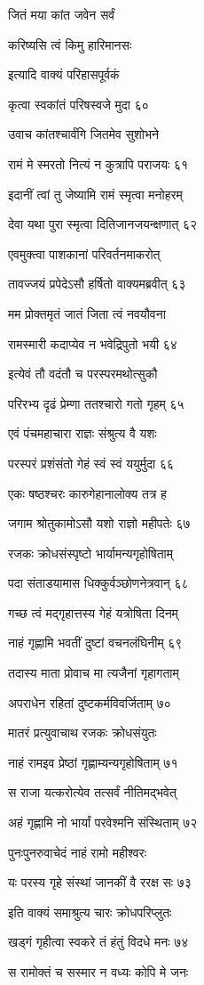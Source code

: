 जितं मया कांत जवेन सर्वं

करिष्यसि त्वं किमु हारिमानसः

इत्यादि वाक्यं परिहासपूर्वकं

कृत्वा स्वकांतं परिषस्वजे मुदा ६०

उवाच कांतश्चार्वंगि जितमेव सुशोभने

रामं मे स्मरतो नित्यं न कुत्रापि पराजयः ६१

इदानीं त्वां तु जेष्यामि रामं स्मृत्वा मनोहरम्

देवा यथा पुरा स्मृत्वा दितिजानजयन्क्षणात् ६२

एवमुक्त्वा पाशकानां परिवर्तनमाकरोत्

तावज्जयं प्रपेदेऽसौ हर्षितो वाक्यमब्रवीत् ६३

मम प्रोक्तमृतं जातं जिता त्वं नवयौवना

रामस्मारी कदाप्येव न भवेद्रिपुतो भयी ६४

इत्येवं तौ वदंतौ च परस्परमथोत्सुकौ

परिरभ्य दृढं प्रेम्णा ततश्चारो गतो गृहम् ६५

एवं पंचमहाचारा राज्ञः संश्रुत्य वै यशः

परस्परं प्रशंसंतो गेहं स्वं स्वं ययुर्मुदा ६६

एकः षष्ठश्चरः कारुगेहानालोक्य तत्र ह

जगाम श्रोतुकामोऽसौ यशो राज्ञो महीपतेः ६७

रजकः क्रोधसंस्पृष्टो भार्यामन्यगृहोषिताम्

पदा संताडयामास धिक्कुर्वञ्छोणनेत्रवान् ६८

गच्छ त्वं मद्गृहात्तस्य गेहं यत्रोषिता दिनम्

नाहं गृह्णामि भवतीं दुष्टां वचनलंघिनीम् ६९

तदास्य माता प्रोवाच मा त्यजैनां गृहागताम्

अपराधेन रहितां दुष्टकर्मविवर्जिताम् ७०

मातरं प्रत्युवाचाथ रजकः क्रोधसंयुतः

नाहं रामइव प्रेष्ठां गृह्णाम्यन्यगृहोषिताम् ७१

स राजा यत्करोत्येव तत्सर्वं नीतिमद्भवेत्

अहं गृह्णामि नो भार्यां परवेश्मनि संस्थिताम् ७२

पुनःपुनरुवाचेदं नाहं रामो महीश्वरः

यः परस्य गृहे संस्थां जानकीं वै ररक्ष सः ७३

इति वाक्यं समाश्रुत्य चारः क्रोधपरिप्लुतः

खड्गं गृहीत्वा स्वकरे तं हंतुं विदधे मनः ७४

स रामोक्तं च सस्मार न वध्यः कोपि मे जनः

